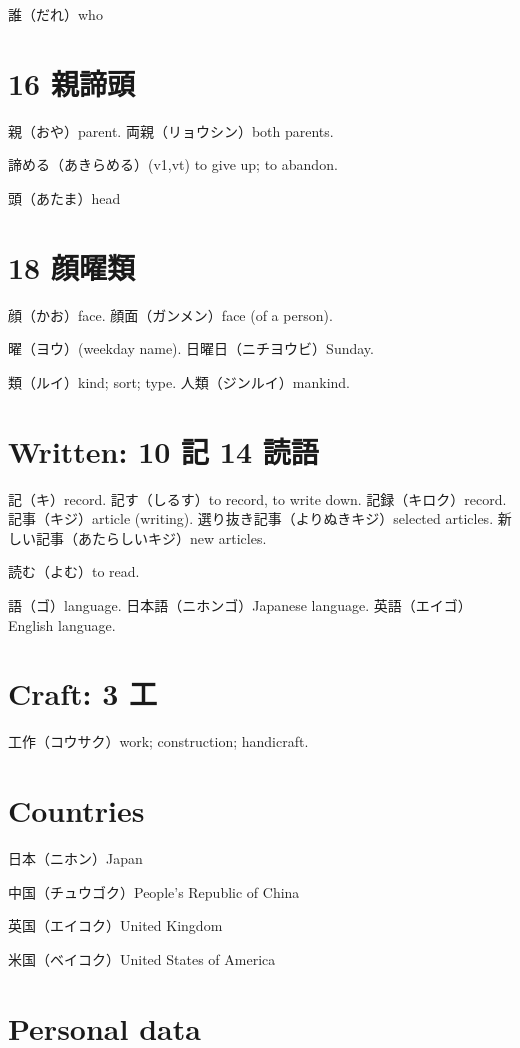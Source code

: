 誰（だれ）who

\section{16 親諦頭}

親（おや）parent.
両親（リョウシン）both parents.

諦める（あきらめる）(v1,vt)
to give up; to abandon.

頭（あたま）head

\section{18 顔曜類}

顔（かお）face.
顔面（ガンメン）face (of a person).

曜（ヨウ）(weekday name).
日曜日（ニチヨウビ）Sunday.

類（ルイ）kind; sort; type.
人類（ジンルイ）mankind.

\section{Written: 10 記 14 読語}

記（キ）record.
記す（しるす）to record, to write down.
記録（キロク）record.
記事（キジ）article (writing).
選り抜き記事（よりぬきキジ）selected articles.
新しい記事（あたらしいキジ）new articles.

読む（よむ）to read.

語（ゴ）language.
日本語（ニホンゴ）Japanese language.
英語（エイゴ）English language.

\section{Craft: 3 工}

工作（コウサク）work; construction; handicraft.

\section{Countries}

日本（ニホン）Japan

中国（チュウゴク）People's Republic of China

英国（エイコク）United Kingdom

米国（ベイコク）United States of America

\section{Personal data}

